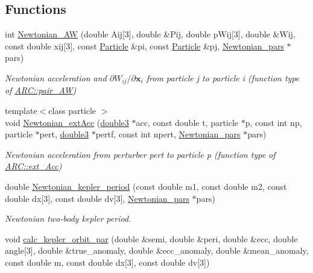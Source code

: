 \subsection*{Functions}
\begin{DoxyCompactItemize}
\item 
int \hyperlink{namespaceNTA_aad37ae368f0a920088e180a73187685a}{Newtonian\+\_\+\+AW} (double Aij\mbox{[}3\mbox{]}, double \&Pij, double p\+Wij\mbox{[}3\mbox{]}, double \&Wij, const double xij\mbox{[}3\mbox{]}, const \hyperlink{classParticle}{Particle} \&pi, const \hyperlink{classParticle}{Particle} \&pj, \hyperlink{classNTA_1_1Newtonian__pars}{Newtonian\+\_\+pars} $\ast$pars)
\begin{DoxyCompactList}\small\item\em Newtonian acceleration and $\partial W_{ij}/\partial \mathbf{x}_i$ from particle j to particle i (function type of \hyperlink{namespaceARC_a270b4c77765cacf073a5ef5f928f1d63}{A\+R\+C\+::pair\+\_\+\+AW}) \end{DoxyCompactList}\item 
{\footnotesize template$<$class particle $>$ }\\void \hyperlink{namespaceNTA_a348d5b866ad9e50a51a398435e8b2ccd}{Newtonian\+\_\+ext\+Acc} (\hyperlink{namespaceNTA_a19ccaac066849b26305dbbbee129fa0e}{double3} $\ast$acc, const double t, particle $\ast$p, const int np, particle $\ast$pert, \hyperlink{namespaceNTA_a19ccaac066849b26305dbbbee129fa0e}{double3} $\ast$pertf, const int npert, \hyperlink{classNTA_1_1Newtonian__pars}{Newtonian\+\_\+pars} $\ast$pars)
\begin{DoxyCompactList}\small\item\em Newtonian acceleration from perturber pert to particle p (function type of \hyperlink{namespaceARC_a7aeda3b3bd009af7ac964748834dd312}{A\+R\+C\+::ext\+\_\+\+Acc}) \end{DoxyCompactList}\item 
double \hyperlink{namespaceNTA_a5125fd91a773d67901c4e0f8896e3dca}{Newtonian\+\_\+kepler\+\_\+period} (const double m1, const double m2, const double dx\mbox{[}3\mbox{]}, const double dv\mbox{[}3\mbox{]}, \hyperlink{classNTA_1_1Newtonian__pars}{Newtonian\+\_\+pars} $\ast$pars)
\begin{DoxyCompactList}\small\item\em Newtonian two-\/body kepler period. \end{DoxyCompactList}\item 
void \hyperlink{namespaceNTA_a02d22f02e21004b264c8257a5ffbb600}{calc\+\_\+kepler\+\_\+orbit\+\_\+par} (double \&semi, double \&peri, double \&ecc, double angle\mbox{[}3\mbox{]}, double \&true\+\_\+anomaly, double \&ecc\+\_\+anomaly, double \&mean\+\_\+anomaly, const double m, const double dx\mbox{[}3\mbox{]}, const double dv\mbox{[}3\mbox{]})

\end{DoxyCompactItemize}
